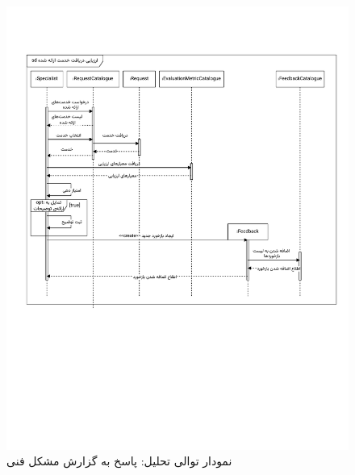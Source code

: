 \begin{figure}[ht!]
	\centering
	\includegraphics[scale=0.8, page=8]{figs/OOD-Sequence-3.pdf}
	\caption{نمودار توالی تحلیل: پاسخ به گزارش مشکل فنی}
\end{figure}
\FloatBarrier
\newpage

